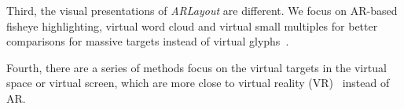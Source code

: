Third, the visual presentations of \textit{ARLayout} are different.
We focus on AR-based fisheye highlighting, virtual word cloud and virtual small multiples for better comparisons
for massive targets instead of virtual glyphs~\cite{Chen2020}.

Fourth, there are a series of methods focus on the virtual targets in the virtual space or virtual screen,
which are more close to virtual reality (VR)~\cite{Sicat2019,Rhee2020,Lee2021} instead of AR.






